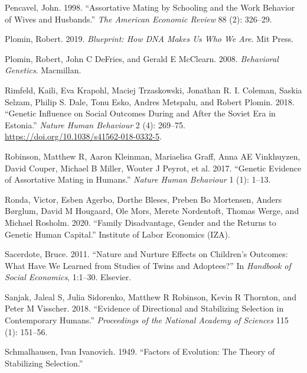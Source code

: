 \documentclass[
]{article}
\newlength{\cslhangindent}
\newlength{\cslentryspacingunit} %
\newenvironment{CSLReferences}[2] %
 {%
  \setlength{\parindent}{0pt}
  \ifodd #1
  \let\oldpar\par
  \def\par{\hangindent=\cslhangindent\oldpar}
  \fi
  \setlength{\parskip}{#2\cslentryspacingunit}
 }%
 {}
\theoremstyle{definition}
\theoremstyle{definition}
\theoremstyle{definition}
\theoremstyle{definition}
\theoremstyle{remark}
\begin{document}
\begin{CSLReferences}{1}{0}
\leavevmode{}%
Pencavel, John. 1998. {``Assortative Mating by Schooling and the Work Behavior of Wives and Husbands.''} \emph{The American Economic Review} 88 (2): 326--29.

\leavevmode{}%
Plomin, Robert. 2019. \emph{Blueprint: How DNA Makes Us Who We Are}. Mit Press.

\leavevmode{}%
Plomin, Robert, John C DeFries, and Gerald E McClearn. 2008. \emph{Behavioral Genetics}. Macmillan.

\leavevmode{}%
Rimfeld, Kaili, Eva Krapohl, Maciej Trzaskowski, Jonathan R. I. Coleman, Saskia Selzam, Philip S. Dale, Tonu Esko, Andres Metspalu, and Robert Plomin. 2018. {``Genetic Influence on Social Outcomes During and After the Soviet Era in Estonia.''} \emph{Nature Human Behaviour} 2 (4): 269--75. \url{https://doi.org/10.1038/s41562-018-0332-5}.

\leavevmode{}%
Robinson, Matthew R, Aaron Kleinman, Mariaelisa Graff, Anna AE Vinkhuyzen, David Couper, Michael B Miller, Wouter J Peyrot, et al. 2017. {``Genetic Evidence of Assortative Mating in Humans.''} \emph{Nature Human Behaviour} 1 (1): 1--13.

\leavevmode{}%
Ronda, Victor, Esben Agerbo, Dorthe Bleses, Preben Bo Mortensen, Anders Børglum, David M Hougaard, Ole Mors, Merete Nordentoft, Thomas Werge, and Michael Rosholm. 2020. {``Family Disadvantage, Gender and the Returns to Genetic Human Capital.''} Institute of Labor Economics (IZA).

\leavevmode{}%
Sacerdote, Bruce. 2011. {``Nature and Nurture Effects on Children's Outcomes: What Have We Learned from Studies of Twins and Adoptees?''} In \emph{Handbook of Social Economics}, 1:1--30. Elsevier.

\leavevmode{}%
Sanjak, Jaleal S, Julia Sidorenko, Matthew R Robinson, Kevin R Thornton, and Peter M Visscher. 2018. {``Evidence of Directional and Stabilizing Selection in Contemporary Humans.''} \emph{Proceedings of the National Academy of Sciences} 115 (1): 151--56.

\leavevmode{}%
Schmalhausen, Ivan Ivanovich. 1949. {``Factors of Evolution: The Theory of Stabilizing Selection.''}


\end{CSLReferences}
\end{document}
